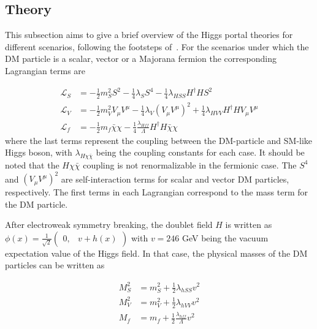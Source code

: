 \subsection{Theory}
\label{subsec:higgs_portal_theory}

This subsection aims to give a brief overview of the Higgs portal theories for different scenarios, following the footsteps of~\cite{Djouadi:2011aa}.
For the scenarios under which the DM particle is a scalar, vector or a Majorana fermion the corresponding Lagrangian terms are 

\begin{equation}
    \begin{split}
        \mathcal{L}_{S} &= -\frac{1}{2} m_{S}^{2} S^{2} - \frac{1}{4} \lambda_{S} S^{4} - \frac{1}{4} \lambda_{HSS} H^{\dag} H S^{2} \\
        \mathcal{L}_{V} &= -\frac{1}{2} m_{V}^{2} V_{\mu} V^{\mu} - \frac{1}{4} \lambda_{V} (V_{\mu} V^{\mu})^{2} + \frac{1}{4} \lambda_{HVV} H^{\dag} H V_{\mu} V^{\mu} \\
        \mathcal{L}_{f} &= -\frac{1}{2} m_{f} \bar{\chi} \chi - \frac{1}{4} \frac{\lambda_{Hff}}{\Lambda} H^{\dag} H \bar{\chi} \chi
    \end{split}
    \label{eq:higgs_portal_lagrangians}
\end{equation}
where the last terms represent the coupling between the DM-particle and SM-like Higgs boson, with $\lambda_{H\chi\bar{\chi}}$ being the coupling constants for each case.
It should be noted that the $H\chi\bar{\chi}$ coupling is not renormalizable in the fermionic case. The $S^{4}$ and $(V_{\mu} V^{\mu})^{2}$ are self-interaction terms
for scalar and vector DM particles, respectively. The first terms in each Lagrangian correspond to the mass term for the DM particle.

After electroweak symmetry breaking, the doublet field $H$ is written as $\phi(x) = \frac{1}{\sqrt{2}} \begin{pmatrix} 0, & v + h(x) \end{pmatrix}$ with $v = 246$ GeV
being the vacuum expectation value of the Higgs field. In that case, the physical masses of the DM particles can be written as~\cite{Djouadi:2011aa}

\begin{equation}
    \begin{split}
        M_{S}^2 &= m_{S}^2 + \frac{1}{2} \lambda_{hSS} v^{2} \\
        M_{V}^2 &= m_{V}^2 + \frac{1}{2} \lambda_{hVV} v^{2} \\
        M_{f}   &= m_{f}   + \frac{1}{2} \frac{\lambda_{hff}}{\Lambda} v^{2}
    \end{split}
\end{equation}

